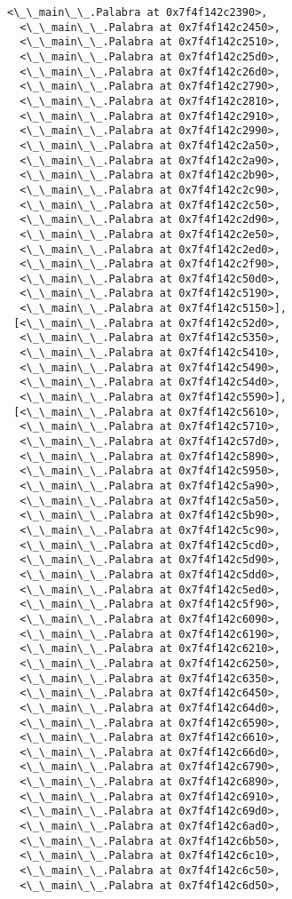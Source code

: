 \documentclass[12pt,a4paper,table]{article}
\begin{document}
\begin{tcolorbox}[breakable, size=fbox, boxrule=.5pt, pad at break*=1mm, opacityfill=0]
\begin{Verbatim}[commandchars=\\\{\}]
  <\_\_main\_\_.Palabra at 0x7f4f142c2390>,
  <\_\_main\_\_.Palabra at 0x7f4f142c2450>,
  <\_\_main\_\_.Palabra at 0x7f4f142c2510>,
  <\_\_main\_\_.Palabra at 0x7f4f142c25d0>,
  <\_\_main\_\_.Palabra at 0x7f4f142c26d0>,
  <\_\_main\_\_.Palabra at 0x7f4f142c2790>,
  <\_\_main\_\_.Palabra at 0x7f4f142c2810>,
  <\_\_main\_\_.Palabra at 0x7f4f142c2910>,
  <\_\_main\_\_.Palabra at 0x7f4f142c2990>,
  <\_\_main\_\_.Palabra at 0x7f4f142c2a50>,
  <\_\_main\_\_.Palabra at 0x7f4f142c2a90>,
  <\_\_main\_\_.Palabra at 0x7f4f142c2b90>,
  <\_\_main\_\_.Palabra at 0x7f4f142c2c90>,
  <\_\_main\_\_.Palabra at 0x7f4f142c2c50>,
  <\_\_main\_\_.Palabra at 0x7f4f142c2d90>,
  <\_\_main\_\_.Palabra at 0x7f4f142c2e50>,
  <\_\_main\_\_.Palabra at 0x7f4f142c2ed0>,
  <\_\_main\_\_.Palabra at 0x7f4f142c2f90>,
  <\_\_main\_\_.Palabra at 0x7f4f142c50d0>,
  <\_\_main\_\_.Palabra at 0x7f4f142c5190>,
  <\_\_main\_\_.Palabra at 0x7f4f142c5150>],
 [<\_\_main\_\_.Palabra at 0x7f4f142c52d0>,
  <\_\_main\_\_.Palabra at 0x7f4f142c5350>,
  <\_\_main\_\_.Palabra at 0x7f4f142c5410>,
  <\_\_main\_\_.Palabra at 0x7f4f142c5490>,
  <\_\_main\_\_.Palabra at 0x7f4f142c54d0>,
  <\_\_main\_\_.Palabra at 0x7f4f142c5590>],
 [<\_\_main\_\_.Palabra at 0x7f4f142c5610>,
  <\_\_main\_\_.Palabra at 0x7f4f142c5710>,
  <\_\_main\_\_.Palabra at 0x7f4f142c57d0>,
  <\_\_main\_\_.Palabra at 0x7f4f142c5890>,
  <\_\_main\_\_.Palabra at 0x7f4f142c5950>,
  <\_\_main\_\_.Palabra at 0x7f4f142c5a90>,
  <\_\_main\_\_.Palabra at 0x7f4f142c5a50>,
  <\_\_main\_\_.Palabra at 0x7f4f142c5b90>,
  <\_\_main\_\_.Palabra at 0x7f4f142c5c90>,
  <\_\_main\_\_.Palabra at 0x7f4f142c5cd0>,
  <\_\_main\_\_.Palabra at 0x7f4f142c5d90>,
  <\_\_main\_\_.Palabra at 0x7f4f142c5dd0>,
  <\_\_main\_\_.Palabra at 0x7f4f142c5ed0>,
  <\_\_main\_\_.Palabra at 0x7f4f142c5f90>,
  <\_\_main\_\_.Palabra at 0x7f4f142c6090>,
  <\_\_main\_\_.Palabra at 0x7f4f142c6190>,
  <\_\_main\_\_.Palabra at 0x7f4f142c6210>,
  <\_\_main\_\_.Palabra at 0x7f4f142c6250>,
  <\_\_main\_\_.Palabra at 0x7f4f142c6350>,
  <\_\_main\_\_.Palabra at 0x7f4f142c6450>,
  <\_\_main\_\_.Palabra at 0x7f4f142c64d0>,
  <\_\_main\_\_.Palabra at 0x7f4f142c6590>,
  <\_\_main\_\_.Palabra at 0x7f4f142c6610>,
  <\_\_main\_\_.Palabra at 0x7f4f142c66d0>,
  <\_\_main\_\_.Palabra at 0x7f4f142c6790>,
  <\_\_main\_\_.Palabra at 0x7f4f142c6890>,
  <\_\_main\_\_.Palabra at 0x7f4f142c6910>,
  <\_\_main\_\_.Palabra at 0x7f4f142c69d0>,
  <\_\_main\_\_.Palabra at 0x7f4f142c6ad0>,
  <\_\_main\_\_.Palabra at 0x7f4f142c6b50>,
  <\_\_main\_\_.Palabra at 0x7f4f142c6c10>,
  <\_\_main\_\_.Palabra at 0x7f4f142c6c50>,
  <\_\_main\_\_.Palabra at 0x7f4f142c6d50>,

\end{Verbatim}
\end{tcolorbox}
\end{document}
